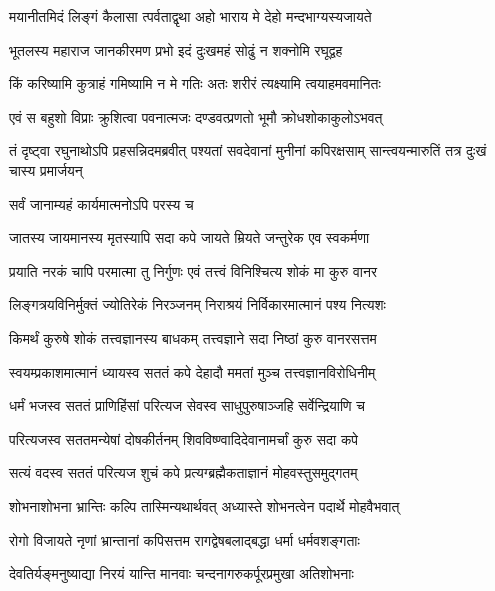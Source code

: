 \twolineshloka
{मयानीतमिदं लिङ्गं कैलासा त्पर्वताद्वृथा}
{अहो भाराय मे देहो मन्दभाग्यस्यजायते}%

\twolineshloka
{भूतलस्य महाराज जानकीरमण प्रभो}
{इदं दुःखमहं सोढुं न शक्नोमि रघूद्वह}%

\twolineshloka
{किं करिष्यामि कुत्राहं गमिष्यामि न मे गतिः}
{अतः शरीरं त्यक्ष्यामि त्वयाहमवमानितः}%


\twolineshloka
{एवं स बहुशो विप्राः क्रुशित्वा पवनात्मजः}
{दण्डवत्प्रणतो भूमौ क्रोधशोकाकुलोऽभवत्}%

\threelineshloka
{तं दृष्ट्वा रघुनाथोऽपि प्रहसन्निदमब्रवीत्}
{पश्यतां सवदेवानां मुनीनां कपिरक्षसाम्}
{सान्त्वयन्मारुतिं तत्र दुःखं चास्य प्रमार्जयन्}%


\onelineshloka
{सर्वं जानाम्यहं कार्यमात्मनोऽपि परस्य च}%

\twolineshloka
{जातस्य जायमानस्य मृतस्यापि सदा कपे}
{जायते म्रियते जन्तुरेक एव स्वकर्मणा} %

\twolineshloka
{प्रयाति नरकं चापि परमात्मा तु निर्गुणः}
{एवं तत्त्वं विनिश्चित्य शोकं मा कुरु वानर}%

\twolineshloka
{लिङ्गत्रयविनिर्मुक्तं ज्योतिरेकं निरञ्जनम्}
{निराश्रयं निर्विकारमात्मानं पश्य नित्यशः}%

\twolineshloka
{किमर्थं कुरुषे शोकं तत्त्वज्ञानस्य बाधकम्}
{तत्त्वज्ञाने सदा निष्ठां कुरु वानरसत्तम}%

\twolineshloka
{स्वयम्प्रकाशमात्मानं ध्यायस्व सततं कपे}
{देहादौ ममतां मुञ्च तत्त्वज्ञानविरोधिनीम्}%

\twolineshloka
{धर्मं भजस्व सततं प्राणिहिंसां परित्यज}
{सेवस्व साधुपुरुषाञ्जहि सर्वेन्द्रियाणि च}%

\twolineshloka
{परित्यजस्व सततमन्येषां दोषकीर्तनम्}
{शिवविष्ण्वादिदेवानामर्चां कुरु सदा कपे}%

\twolineshloka
{सत्यं वदस्व सततं परित्यज शुचं कपे}
{प्रत्यग्ब्रह्मैकताज्ञानं मोहवस्तुसमुद्गतम्}%

\twolineshloka
{शोभनाशोभना भ्रान्तिः कल्पि तास्मिन्यथार्थवत्}
{अध्यास्ते शोभनत्वेन पदार्थे मोहवैभवात्}%

\twolineshloka
{रोगो विजायते नृणां भ्रान्तानां कपिसत्तम}
{रागद्वेषबलाद्बद्धा धर्मा धर्मवशङ्गताः}%

\twolineshloka
{देवतिर्यङ्मनुष्याद्या निरयं यान्ति मानवाः}
{चन्दनागरुकर्पूरप्रमुखा अतिशोभनाः}%

